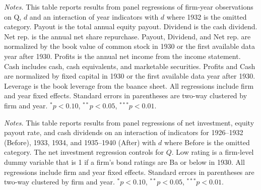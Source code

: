 \begin{table}[p]\centering
\caption{\\ Gold clause exposure and other outcomes} \scriptsize   
\label{tab:div_main} \renewcommand{\arraystretch}{1.2}



\vspace*{3mm} \justifying \noindent
\scriptsize{\textit{Notes.} This table reports results from panel regressions of firm-year  observations on Q, $d$ and an interaction of year indicators with $d$ where 1932 is the omitted category. Payout is the total annual equity payout. Dividend is the cash dividend. Net rep. is the annual net share repurchase. Payout, Dividend, and Net rep. are normalized by the book value of common stock in 1930 or the first available data year after 1930. Profits is the annual net income from the income statement. Cash includes cash, cash equivalents, and marketable securities. Profits and Cash are normalized by fixed capital in 1930 or the first available data year after 1930. Leverage is the book leverage from the baance sheet. All regressions include firm and year fixed effects. Standard errors in parentheses are two-way clustered by firm and year. $^{*}p<0.10$, $^{**}p<0.05$, $^{***}p<0.01$.}
\end{table}

\begin{table}[p]\centering
\caption{\\ Gold clause exposure, investment, and payout by credit rating} \scriptsize   
\label{tab:rating} \renewcommand{\arraystretch}{1.2}



\vspace*{3mm} \justifying \noindent
\scriptsize{\textit{Notes.} This table reports results from panel regressions of net investment, equity payout rate, and cash dividends on an interaction of indicators for 1926--1932 (Before), 1933, 1934, and 1935--1940 (After) with $d$ where Before is the omitted category. The net investment regression controls for $Q$. Low rating is a firm-level dummy variable that is 1 if a firm's bond ratings are Ba or below in 1930. All regressions include firm and year fixed effects. Standard errors in parentheses are two-way clustered by firm and year. $^{*}p<0.10$, $^{**}p<0.05$, $^{***}p<0.01$.}
\end{table}

